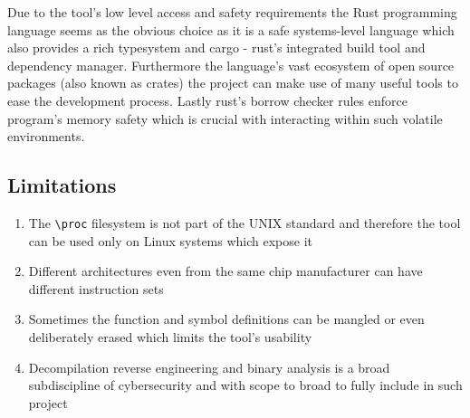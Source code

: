 Due to the tool's low level access and safety requirements the Rust programming language seems as the obvious choice as it is a safe systems-level language which also provides a rich typesystem and cargo - rust's integrated build tool and dependency manager. 
Furthermore the language's vast ecosystem of open source packages (also known as crates) the project can make use of many useful tools to ease the development process.
Lastly rust's borrow checker rules \cite{TODO} enforce program's memory safety which is crucial with interacting within such volatile environments.

\subsection{Limitations}

\begin{enumerate}
    \item The \verb|\proc| filesystem is not part of the UNIX standard \cite{kerrisk_proc_2010} and therefore the tool can be used only on Linux systems which expose it
    \item Different architectures even from the same chip manufacturer can have different instruction sets \cite{intel_corporation_intel_2024}
    \item Sometimes the function and symbol definitions can be mangled or even deliberately erased which limits the tool's usability
    \item Decompilation reverse engineering and binary analysis is a broad subdiscipline of cybersecurity and with scope to broad to fully include in such project
\end{enumerate}
